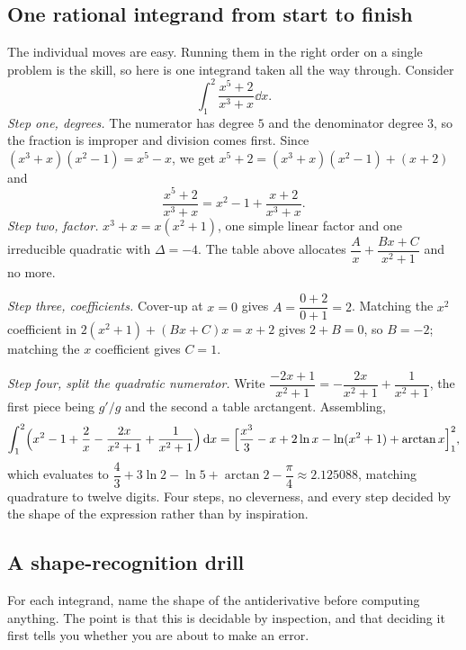 \subsection{One rational integrand from start to finish}

The individual moves are easy. Running them in the right order on a single problem is the skill, so here is one integrand taken all the way through. Consider
\[
\int_1^2\frac{x^5+2}{x^3+x}\dd x .
\]
\emph{Step one, degrees.} The numerator has degree $5$ and the denominator degree $3$, so the fraction is improper and division comes first. Since $(x^3+x)(x^2-1)=x^5-x$, we get $x^5+2=(x^3+x)(x^2-1)+(x+2)$ and
\[
\frac{x^5+2}{x^3+x}=x^2-1+\frac{x+2}{x^3+x}.
\]
\emph{Step two, factor.} $x^3+x=x(x^2+1)$, one simple linear factor and one irreducible quadratic with $\Delta=-4$. The table above allocates $\dfrac{A}{x}+\dfrac{Bx+C}{x^2+1}$ and no more.

\emph{Step three, coefficients.} Cover-up at $x=0$ gives $A=\dfrac{0+2}{0+1}=2$. Matching the $x^2$ coefficient in $2(x^2+1)+(Bx+C)x=x+2$ gives $2+B=0$, so $B=-2$; matching the $x$ coefficient gives $C=1$.

\emph{Step four, split the quadratic numerator.} Write $\dfrac{-2x+1}{x^2+1}=-\dfrac{2x}{x^2+1}+\dfrac{1}{x^2+1}$, the first piece being $g'/g$ and the second a table arctangent. Assembling,
\[
\int_1^2\Bigl(x^2-1+\frac2x-\frac{2x}{x^2+1}+\frac{1}{x^2+1}\Bigr)\,\mathrm{d} x
=\Bigl[\frac{x^3}{3}-x+2\ln x-\ln(x^2+1)+\arctan x\Bigr]_1^2 ,
\]
which evaluates to $\dfrac43+3\ln2-\ln5+\arctan2-\dfrac{\pi}{4}\approx2.125088$, matching quadrature to twelve digits. Four steps, no cleverness, and every step decided by the shape of the expression rather than by inspiration.

\subsection{A shape-recognition drill}

For each integrand, name the shape of the antiderivative before computing anything. The point is that this is decidable by inspection, and that deciding it first tells you whether you are about to make an error.

